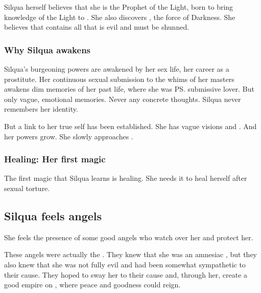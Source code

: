 Silqua herself believes that she is the Prophet of the Light, born to bring knowledge of the Light to \Miith{}. She also discovers \nieur{}, the force of Darkness. She believes that \nieur{} contains all that is evil and must be shunned. 





\subsubsection{Why Silqua awakens}
Silqua's burgeoning powers are awakened by her sex life, her career as a prostitute. 
Her continuous sexual submission to the whims of her masters awakens dim memories of her past life, where she was \ps{\Shiaraid} submissive lover. 
But only vague, emotional memories. 
Never any concrete thoughts. 
Silqua never remembers her identity. 

But a link to her true self has been established. 
She has vague visions and \dejavus. 
And her powers grow. 
She slowly approaches . 





\subsubsection{Healing: Her first magic}
The first magic that Silqua learns is healing. 
She needs it to heal herself after sexual torture. 










\subsection{Silqua feels angels}
She feels the presence of some good angels who watch over her and protect her. 


These angels were actually the \Kezeradi. 
They knew that she was an amnesiac \malach, but they also knew that she was not fully evil and had been somewhat sympathetic to their cause. 
They hoped to sway her to their cause and, through her, create a good empire on \Miith{}, where peace and goodness could reign. 

